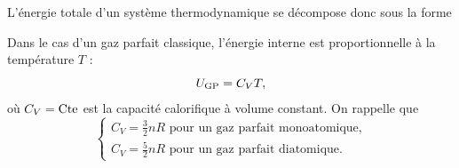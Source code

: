 \documentclass[12pt,fancy]{cours}
\begin{document}
L'énergie totale d'un système thermodynamique se décompose donc sous la forme
\begin{remarque}
  Dans le cas d’un gaz parfait classique, l’énergie interne est proportionnelle à la température $T$ : 
  \begin{equation}
    U_{\rm GP} = C_V T,
  \end{equation}
  où $C_V = \text{Cte}$ est la capacité calorifique à volume constant. On rappelle que 
  \begin{equation}
    \left\{ 
    \begin{array}{l}
      C_V = \frac{3}{2} nR \text{ pour un gaz parfait monoatomique,} \\
      C_V = \frac{5}{2} nR \text{ pour un gaz parfait diatomique.}
    \end{array}
    \right.
  \end{equation}
\end{remarque}




\end{document}
